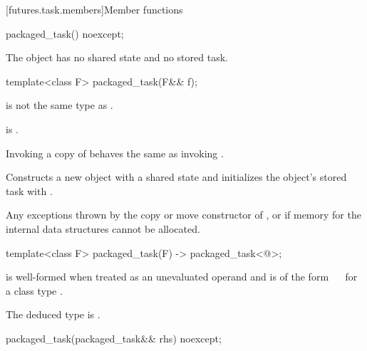 [futures.task.members]{Member functions}

%
\begin{itemdecl}
packaged_task() noexcept;
\end{itemdecl}

\begin{itemdescr}
\pnum
\effects
The object has no shared state and no stored task.
\end{itemdescr}

%
\begin{itemdecl}
template<class F>
  packaged_task(F&& f);
\end{itemdecl}

\begin{itemdescr}
\pnum
\constraints
{}
is not the same type as .

\pnum
\mandates
{} is .

\pnum
\expects
Invoking a copy of  behaves the same as invoking .

\pnum
\effects
Constructs a new  object with a shared state and
initializes the object's stored task with .

\pnum
\throws
Any exceptions thrown by the copy or move constructor of , or
 if memory for the internal data structures
cannot be allocated.
\end{itemdescr}

%
\begin{itemdecl}
template<class F> packaged_task(F) -> packaged_task<@\seebelow@>;
\end{itemdecl}

\begin{itemdescr}
\pnum
\constraints
{} is well-formed when
treated as an unevaluated operand and
 is of the form
~\cv{}~
for a class type .

\pnum
\remarks
The deduced type is .
\end{itemdescr}

%
\begin{itemdecl}
packaged_task(packaged_task&& rhs) noexcept;
\end{itemdecl}

